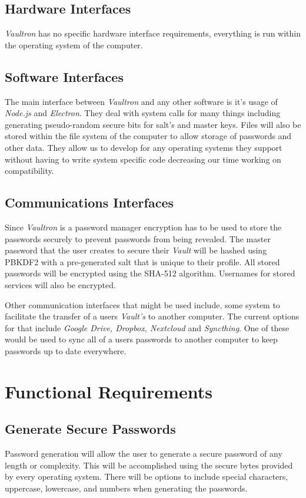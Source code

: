 \documentclass[11pt]{report}
\begin{document}
\subsection{Hardware Interfaces}
\textit{Vaultron} has no specific hardware interface requirements, everything is
run within the operating system of the computer. 


\subsection{Software Interfaces}
The main interface between \textit{Vaultron} and any other software is it's
usage of \textit{Node.js} and \textit{Electron}. They deal with system calls 
for many things including generating pseudo-random secure bits for salt's and 
master keys. Files will also be stored within the file system of the computer 
to allow storage of passwords and other data. They allow us to develop for
any operating systems they support without having to write system specific
code decreasing our time working on compatibility. 


\subsection{Communications Interfaces}
Since \textit{Vaultron} is a password manager encryption has to be used
to store the passwords securely to prevent passwords from being revealed.
The master password that the user creates to secure their \textit{Vault}
will be hashed using PBKDF2 with a pre-generated salt that is unique to
their profile. All stored passwords will be encrypted using the SHA-512 
algorithm. Usernames for stored services will also be encrypted.


Other communication interfaces that might be used include, some system
to facilitate the transfer of a users \textit{Vault's} to another computer.
The current options for that include \textit{Google Drive, Dropbox, Nextcloud}
and \textit{Syncthing}. One of these would be used to sync all of a users
passwords to another computer to keep passwords up to date everywhere.


\section{Functional Requirements}

\subsection{Generate Secure Passwords}
Password generation will allow the user to generate a secure password of any length or 
complexity. This will be accomplished using the secure bytes provided by every
operating system. There will be options to include special characters, uppercase,
lowercase, and numbers when generating the passwords.
\end{document}
